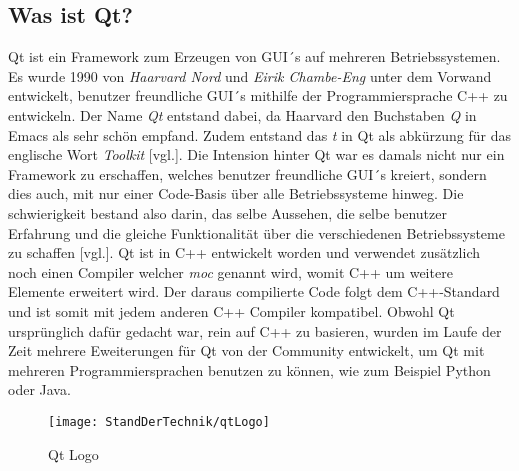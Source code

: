 \subsection{Was ist Qt?}
\label{subsec:WasIstQt}
Qt ist ein Framework zum Erzeugen von GUI´s auf mehreren Betriebssystemen. Es wurde 1990 von
\emph{Haarvard Nord} und \emph{Eirik Chambe-Eng} unter dem Vorwand entwickelt, benutzer
freundliche GUI´s mithilfe der Programmiersprache C++ zu entwickeln. Der Name \emph{Qt}
entstand dabei, da Haarvard den Buchstaben \emph{Q} in Emacs als sehr schön empfand. Zudem entstand das \emph{t} in Qt als
abkürzung für das englische Wort \emph{Toolkit} \cite{qtStory}[vgl.].
\newline
\newline
Die Intension hinter Qt war es damals nicht nur ein Framework zu erschaffen, welches benutzer
freundliche GUI´s kreiert, sondern dies auch, mit nur einer Code-Basis über alle Betriebssysteme
hinweg. Die schwierigkeit bestand also darin, das selbe Aussehen, die selbe benutzer Erfahrung
und die gleiche Funktionalität über die verschiedenen Betriebssysteme zu
schaffen \cite{GettingStartedQt}[vgl.].
\newline
\newline
Qt ist in C++ entwickelt worden und verwendet zusätzlich noch einen Compiler welcher
\emph{\ac{moc}} genannt wird, womit C++ um weitere Elemente erweitert wird. Der daraus
compilierte Code folgt dem C++-Standard und ist somit mit jedem anderen C++ Compiler kompatibel.
Obwohl Qt ursprünglich dafür gedacht war, rein auf C++ zu basieren, wurden im Laufe der Zeit
mehrere Eweiterungen für Qt von der Community entwickelt, um Qt mit mehreren Programmiersprachen
benutzen zu können, wie zum Beispiel Python oder Java.
\begin{figure}[h]
    \centering
    \texttt{[image: StandDerTechnik/qtLogo]}
    \caption[Qt Logo]{Qt Logo}
    \label{img:qtLogo}
\end{figure}